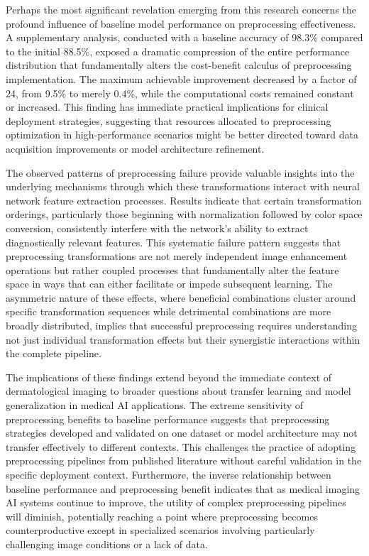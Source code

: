 \documentclass[journal]{IEEEtran}
\begin{document}
Perhaps the most significant revelation emerging from this research concerns the profound influence of baseline model performance on preprocessing effectiveness. A supplementary analysis, conducted with a baseline accuracy of 98.3\% compared to the initial 88.5\%, exposed a dramatic compression of the entire performance distribution that fundamentally alters the cost-benefit calculus of preprocessing implementation. The maximum achievable improvement decreased by a factor of 24, from 9.5\% to merely 0.4\%, while the computational costs remained constant or increased. This finding has immediate practical implications for clinical deployment strategies, suggesting that resources allocated to preprocessing optimization in high-performance scenarios might be better directed toward data acquisition improvements or model architecture refinement.

The observed patterns of preprocessing failure provide valuable insights into the underlying mechanisms through which these transformations interact with neural network feature extraction processes. Results indicate that certain transformation orderings, particularly those beginning with normalization followed by color space conversion, consistently interfere with the network's ability to extract diagnostically relevant features. This systematic failure pattern suggests that preprocessing transformations are not merely independent image enhancement operations but rather coupled processes that fundamentally alter the feature space in ways that can either facilitate or impede subsequent learning. The asymmetric nature of these effects, where beneficial combinations cluster around specific transformation sequences while detrimental combinations are more broadly distributed, implies that successful preprocessing requires understanding not just individual transformation effects but their synergistic interactions within the complete pipeline.

The implications of these findings extend beyond the immediate context of dermatological imaging to broader questions about transfer learning and model generalization in medical AI applications. The extreme sensitivity of preprocessing benefits to baseline performance suggests that preprocessing strategies developed and validated on one dataset or model architecture may not transfer effectively to different contexts. This challenges the practice of adopting preprocessing pipelines from published literature without careful validation in the specific deployment context. Furthermore, the inverse relationship between baseline performance and preprocessing benefit indicates that as medical imaging AI systems continue to improve, the utility of complex preprocessing pipelines will diminish, potentially reaching a point where preprocessing becomes counterproductive except in specialized scenarios involving particularly challenging image conditions or a lack of data.
\end{document}
